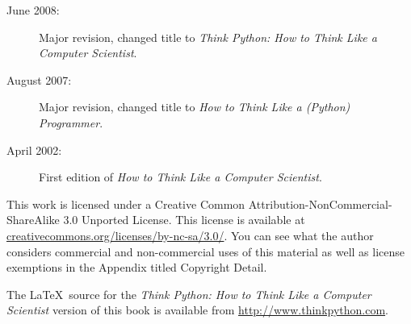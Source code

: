 \begin{latexonly}
{\begin{description}
\item[June 2008:] Major revision, changed title to
\emph{Think Python: How to Think Like
a Computer Scientist}.

\item[August 2007:] Major revision, changed title to
\emph{How to Think Like a (Python) Programmer}.

\item[April 2002:] First edition of \emph{How to Think Like
a Computer Scientist}.

\end{description}

\vspace{0.2in}

This work is licensed under a 
Creative Common
Attribution-NonCommercial-ShareAlike 3.0 Unported License.
This license is 
available at
\url{creativecommons.org/licenses/by-nc-sa/3.0/}.  You can 
see what the author considers commercial and non-commercial
uses of this material as well as license exemptions 
in the Appendix titled Copyright Detail.

The \LaTeX\ source for the 
\emph{Think Python: How to Think Like
a Computer Scientist}
version of this book is available from
\url{http://www.thinkpython.com}.

\vspace{0.2in}

} %

\end{latexonly}


